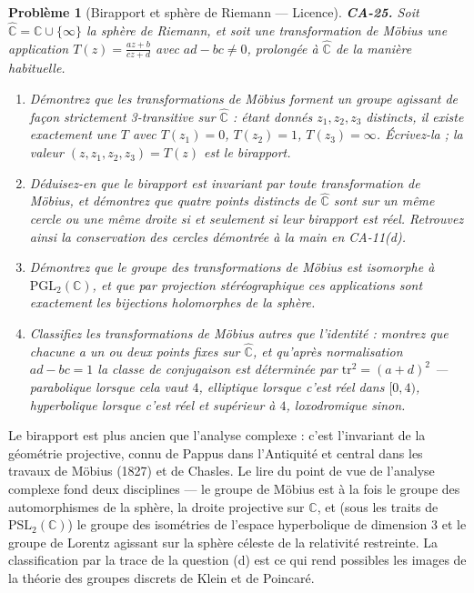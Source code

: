 \documentclass[11pt]{article}
\newtheorem{problem}{Problème}
\begin{document}
\begin{problem}[{Birapport et sphère de Riemann --- Licence}]
\textbf{CA-25.} Soit $ \hat{\mathbb{C}} = \mathbb{C} \cup \{\infty\} $ la sphère de Riemann,
et soit une transformation de Möbius une application $ T(z) = \frac{az + b}{cz + d} $ avec
$ ad - bc \ne 0 $, prolongée à $ \hat{\mathbb{C}} $ de la manière habituelle.
\begin{enumerate}
\item[(a)] Démontrez que les transformations de Möbius forment un groupe agissant de façon strictement
3-transitive sur $ \hat{\mathbb{C}} $ : étant donnés $ z_1, z_2, z_3 $ distincts, il existe
exactement une $ T $ avec $ T(z_1) = 0 $, $ T(z_2) = 1 $, $ T(z_3) = \infty $. Écrivez-la ;
la valeur $ (z, z_1, z_2, z_3) = T(z) $ est le \textit{birapport}.
\item[(b)] Déduisez-en que le birapport est invariant par toute transformation de Möbius, et démontrez que
quatre points distincts de $ \hat{\mathbb{C}} $ sont sur un même cercle ou une même droite si et
seulement si leur birapport est réel. Retrouvez ainsi la conservation des cercles démontrée à la
main en CA-11(d).
\item[(c)] Démontrez que le groupe des transformations de Möbius est isomorphe à
$ \mathrm{PGL}_2(\mathbb{C}) $, et que par projection stéréographique ces applications sont
exactement les bijections holomorphes de la sphère.
\item[(d)] Classifiez les transformations de Möbius autres que l'identité : montrez que chacune a un ou
deux points fixes sur $ \hat{\mathbb{C}} $, et qu'après normalisation $ ad - bc = 1 $ la classe
de conjugaison est déterminée par $ \mathrm{tr}^2 = (a + d)^2 $ --- parabolique lorsque cela vaut
$ 4 $, elliptique lorsque c'est réel dans $ [0, 4) $, hyperbolique lorsque c'est réel et
supérieur à $ 4 $, loxodromique sinon.
\end{enumerate}

\end{problem}

\noindent Le birapport est plus ancien que l'analyse complexe : c'est l'invariant de la
géométrie projective, connu de Pappus dans l'Antiquité et central dans les travaux de Möbius (1827)
et de Chasles. Le lire du point de vue de l'analyse complexe fond deux disciplines --- le groupe de
Möbius est à la fois le groupe des automorphismes de la sphère, la droite projective sur
$ \mathbb{C} $, et (sous les traits de $ \mathrm{PSL}_2(\mathbb{C}) $) le groupe des isométries
de l'espace hyperbolique de dimension 3 et le groupe de Lorentz agissant sur la sphère céleste de la
relativité restreinte. La classification par la trace de la question (d) est ce qui rend possibles
les images de la théorie des groupes discrets de Klein et de Poincaré.
\end{document}
